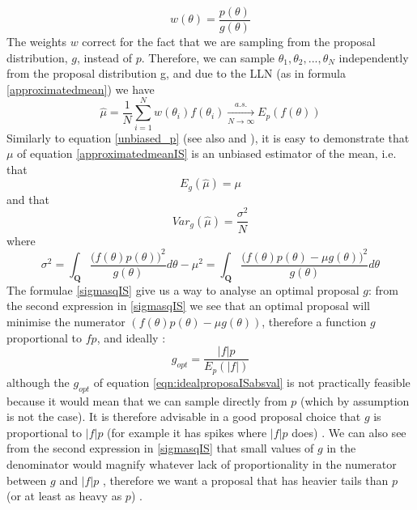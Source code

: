 \documentclass[12pt,mythesisstyle]{report}
\begin{document}
\begin{equation}\label{weightseqn_f_on_g}
w(\theta)=\frac{p(\theta)}{g(\theta)}
\end{equation}
The weights $w$ correct for the fact that we are sampling from the proposal distribution, $g$, instead of $p$.
Therefore, we can sample $\theta_1,\theta_2,...,\theta_N$ independently from the proposal distribution g, and due to the LLN (as in formula \eqref{approximatedmean}) we have
\begin{equation}\label{approximatedmeanIS2}
\hat{\mu}=\frac{1}{N}\sum_{i=1}^{N}w(\theta_{i})f(\theta_{i}) \xrightarrow[N \to \infty]{a.s.} E_{p}(f(\theta))
\end{equation}
Similarly to equation \eqref{unbiased_p} (see also \cite{mcmcnotes} and \cite{OwenIS}), it is easy to demonstrate that $\mu$ of equation \eqref{approximatedmeanIS} is an unbiased estimator of the mean, i.e. that
\begin{equation}
E_g(\hat{\mu})=\mu
\end{equation}
and that \cite{OwenIS}
\begin{equation}\label{varianceIS}
Var_g(\hat{\mu})=\frac{\sigma^2}{N}
\end{equation}
where
\begin{equation}\label{sigmasqIS}
\sigma^2=\int_{\mathbf{Q}}\frac{\big(f(\theta)p(\theta)\big)^2}{g(\theta)}d\theta-\mu^2=\int_{\mathbf{Q}}\frac{\big(f(\theta)p(\theta)-\mu g(\theta)\big)^2}{g(\theta)}d\theta
\end{equation}
The formulae \eqref{sigmasqIS} give us a way to analyse an optimal proposal $g$: from the second expression in  \eqref{sigmasqIS} we see that an optimal proposal will minimise the numerator $(f(\theta)p(\theta)-\mu g(\theta))$, therefore a function $g$ proportional to $fp$, and ideally \cite{OwenIS}:
\begin{equation}\label{eqn:idealproposaISabsval}
g_{opt}=\frac{|f|p}{E_p(|f|)}
\end{equation}
although the $g_{opt}$ of equation \eqref{eqn:idealproposaISabsval} is not practically feasible because it would mean that we can sample directly from $p$ (which by assumption is not the case). It is therefore advisable in a good proposal choice that $g$ is proportional to $|f|p$ (for example it has spikes where $|f|p$ does) \cite{OwenIS}. We can also see from the second expression in \eqref{sigmasqIS} that small values of $g$ in the denominator would magnify whatever lack of proportionality in the numerator between $g$ and $|f|p$ \cite{OwenIS}, therefore we want a proposal that has heavier tails than $p$ (or at least as heavy as $p$) \cite{mcmcnotes}. 
\end{document}
